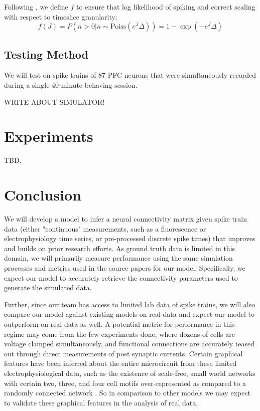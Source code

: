 \documentclass{article}
\begin{document}
Following \citep{mishchencko2011}, we define $f$ to ensure that log likelihood of 
spiking and correct scaling with respect to timeslice granularity: \begin{equation}
\label{f} f(J) = P\left(n>0 | n \sim \text{Poiss}(e^J\Delta)\right) = 1 - \exp(-e^J\Delta) \end{equation}

\subsection{Testing Method}
We will test on spike trains of 87 PFC neurons that were simultaneously recorded during a single 40-minute behaving session.

WRITE ABOUT SIMULATOR!
\section{Experiments}
TBD.

\section{Conclusion}
We will develop a model to infer a neural connectivity matrix given spike train data (either "continuous" measurements, such as a fluorescence or electrophysiology time series, or pre-processed discrete spike times) that improves and builds on prior research efforts. As ground truth data is limited in this domain, we will primarily measure performance using the same simulation processes and metrics used in the source papers for our model.  Specifically, we expect our model to accurately retrieve the connectivity parameters used to generate the simulated data.  

Further, since our team has access to limited lab data of spike trains, we will also compare our model against existing models on real data and expect our model to outperform on real data as well.  A potential metric for performance in this regime may come from the few experiments done, where dozens of cells are voltage clamped simultaneously, and functional connections are accurately teased out through direct measurements of post synaptic currents.  Certain graphical features have been inferred about the entire microcircuit from these limited electrophysiological data, such as the existence of scale-free, small world networks with certain two, three, and four cell motifs over-represented as compared to a randomly connected network \citep{song2005,perin2011}.  So in comparison to other models we may expect to validate these graphical features in the analysis of real data.

\begin{small}

 
\end{small}
\end{document}
